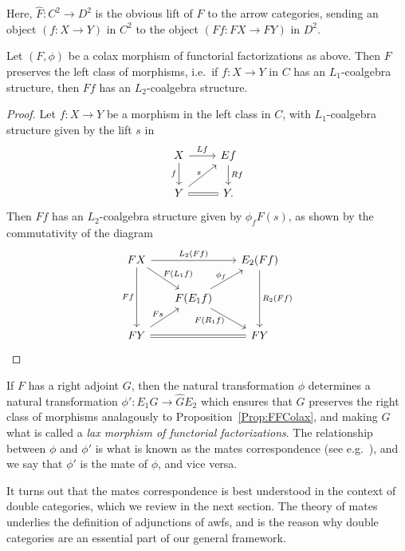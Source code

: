 Here, $\hat{F}\colon C^2\to D^2$ is the obvious lift of $F$ to the arrow categories, sending an object $(f\colon X\to Y)$ in $C^2$ to the object $(Ff\colon FX\to FY)$ in $D^2$.

\begin{proposition}\label{Prop:FFColax}
	Let $(F,\phi)$ be a colax morphism of functorial factorizations as above. Then $F$ preserves the left class of morphisms, i.e.~if $f\colon X\to Y$ in $C$ has an $L_1$-coalgebra structure, then $Ff$ has an $L_2$-coalgebra structure.
\end{proposition}
\begin{proof}
	Let $f\colon X\to Y$ be a morphism in the left class in $C$, with $L_1$-coalgebra structure given by the lift $s$ in 
	\[
	\begin{tikzcd}
		X \rar{Lf} \dar[swap]{f} & Ef \dar{Rf} \\
		Y \urar[][inner sep=1pt]{s} \rar[equal] & Y.
	\end{tikzcd}
	\]
	Then $Ff$ has an $L_2$-coalgebra structure given by $\phi_f F(s)$, as shown by the commutativity of the diagram
	\[
	\begin{tikzcd}[column sep=4ex,row sep=4ex]
		FX \ar{rr}{L_2(Ff)} \ar{dd}[swap]{Ff} \ar{dr}[inner sep=0pt]{F(L_1f)}
			&& E_2(Ff) \ar{dd}{R_2(Ff)} \\
		& F(E_1f) \ar{ur}[inner sep=0pt]{\phi_f} \ar{dr}[inner sep=0pt,swap,pos=.4]{F(R_1f)} & \\
		FY \ar{ur}[inner sep=1pt]{Fs} \ar[equal]{rr}
			&& FY
	\end{tikzcd}
	\]
\end{proof}

If $F$ has a right adjoint $G$, then the natural transformation $\phi$ determines a natural transformation $\phi'\colon E_1\hat{G}\to\hat{G}E_2$ which ensures that $G$ preserves the right class of morphisms analagously to Proposition~\ref{Prop:FFColax}, and making $G$ what is called a \emph{lax morphism of functorial factorizations}. The relationship between $\phi$ and $\phi'$ is what is known as the mates correspondence (see e.g.~\cite{cgr:mates}), and we say that $\phi'$ is the mate of $\phi$, and vice versa.

It turns out that the mates correspondence is best understood in the context of double categories, which we review in the next section. The theory of mates underlies the definition of adjunctions of awfs, and is the reason why double categories are an essential part of our general framework.